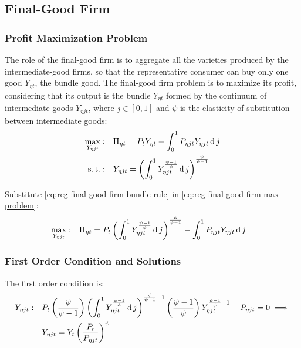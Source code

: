\documentclass[
	thesis.tex
	]{subfiles}
\begin{document}

\subsection{Final-Good Firm}

\subsubsection*{Profit Maximization Problem}

The role of the final-good firm is to aggregate all the varieties produced by the intermediate-good firms, so that the representative consumer can buy only one good $Y_{\eta t}$, the bundle good. The final-good firm problem is to maximize its profit, considering that its output is the bundle $Y_{\eta t}$ formed by the continuum of intermediate goods $Y_{\eta jt}$, where $j \in [0,1]$ and $\psi$ is the elasticity of substitution between intermediate goods:
\begin{align}
	\max_{Y_{\eta jt}}: &\quad \Pi_{\eta t} = P_t Y_{\eta t} - \int_{0}^{1} P_{\eta jt} Y_{\eta jt} \operatorname{d} j \label{eq:reg-final-good-firm-max-problem} \\
	\operatorname{s.t.}: & \quad Y_{\eta jt} = \left( \int_{0}^{1} Y_{\eta jt}^{\frac{\psi-1}{\psi}} \operatorname{d} j \right)^{\frac{\psi}{\psi-1}} \label{eq:reg-final-good-firm-bundle-rule}
\end{align}

Substitute \ref{eq:reg-final-good-firm-bundle-rule} in \ref{eq:reg-final-good-firm-max-problem}:
\begin{align}
	\label{eq:reg-final-good-firm-max-problem-2}
	\max_{Y_{\eta jt}}: & \quad \Pi_{\eta t} = P_t \left( \int_{0}^{1} Y_{\eta jt}^{\frac{\psi-1}{\psi}} \operatorname{d} j \right)^{\frac{\psi}{\psi-1}} - \int_{0}^{1} P_{\eta jt} Y_{\eta jt} \operatorname{d} j
\end{align}

\subsubsection*{First Order Condition and Solutions}

The first order condition is:
\begin{align}
	Y_{\eta jt}:\quad & P_t \left( \frac{\psi}{\psi-1} \right) \left( \int_{0}^{1} Y_{\eta jt}^{\frac{\psi-1}{\psi}} \operatorname{d} j \right)^{\frac{\psi}{\psi-1}-1} \left( \frac{\psi-1}{\psi} \right) Y_{\eta jt}^{\frac{\psi-1}{\psi}-1} - P_{\eta jt} = 0 \implies \nonumber \\
	\label{eq:reg-final-good-firm-FOC}
	& Y_{\eta jt} = Y_t \left( \frac{P_t}{P_{\eta jt}} \right)^{\psi}
\end{align}
\end{document}
